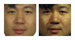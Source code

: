 \begin{figure}
\begin{center}
{\includegraphics[width=\columnwidth/12]{ch5/figures/00029_940128_fa.png}
\includegraphics[width=\columnwidth/12]{ch5/figures/00029_940307_fa.png}
}
\end{center}
\end{figure}
